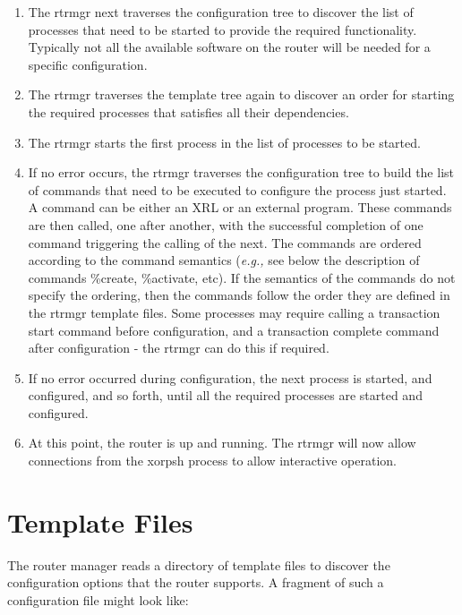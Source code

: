 \documentclass[11pt]{article}
\newcommand{\eg}{\emph{e.g.,}\xspace}
\begin{document}
\begin{enumerate}
  \item The rtrmgr next traverses the configuration tree to discover the list
  of processes that need to be started to provide the required
  functionality.  Typically not all the available software on the router
  will be needed for a specific configuration.

  \item The rtrmgr traverses the template tree again to discover an order for
  starting the required processes that satisfies all their dependencies.

  \item The rtrmgr starts the first process in the list of processes to be
  started.

  \item If no error occurs, the rtrmgr traverses the configuration tree to
  build the list of commands that need to be executed to configure the process
  just started.  A command can be either an XRL or an external program.
  These commands are then called, one after another, with the
  successful completion of one command triggering the calling of the next.
  The commands are ordered according to the command semantics
  (\eg see below the description of commands
  \%create, \%activate, etc). If the semantics of the commands
  do not specify the ordering, then the commands follow the order they
  are defined in the rtrmgr template files.
  Some processes may require calling a transaction start command before
  configuration, and a transaction complete command after configuration -
  the rtrmgr can do this if required.

  \item If no error occurred during configuration, the next process is started,
  and configured, and so forth, until all the required processes are
  started and configured.

  \item At this point, the router is up and running.  The rtrmgr will now
  allow connections from the xorpsh process to allow interactive
  operation.

\end{enumerate}

\newpage

\section{Template Files}

The router manager reads a directory of template files to discover the
configuration options that the router supports.  A fragment of such a
configuration file might look like:
\end{document}
